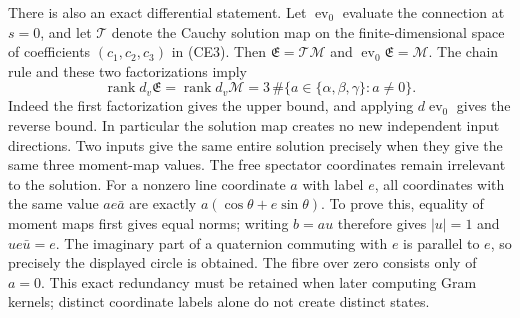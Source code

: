 \documentclass[11pt]{article}
\begin{document}
There is also an exact differential statement. Let \(\operatorname{ev}_0\)
evaluate the connection at \(s=0\), and let \(\mathcal T\) denote the
Cauchy solution map on the finite-dimensional space of coefficients
\((c_1,c_2,c_3)\) in (CE3). Then
\(\mathfrak E=\mathcal T\mathcal M\) and
\(\operatorname{ev}_0\mathfrak E=\mathcal M\). The chain rule and these
two factorizations imply
\[
 \operatorname{rank}d_v\mathfrak E
   =\operatorname{rank}d_v\mathcal M
   =3\,\#\{a\in\{\alpha,\beta,\gamma\}:a\ne0\}.
 \tag{CE34a}
\]
Indeed the first factorization gives the upper bound, and applying
\(d\operatorname{ev}_0\) gives the reverse bound. In particular the
solution map creates no new independent input directions.
Two inputs give the same entire solution precisely when they give the
same three moment-map values. The free spectator coordinates remain
irrelevant to the solution. For a nonzero line coordinate \(a\) with
label \(e\), all coordinates with the same value \(ae\bar a\) are
exactly \(a(\cos\theta+e\sin\theta)\). To prove this, equality of moment
maps first gives equal norms; writing \(b=au\) therefore gives
\(|u|=1\) and \(ue\bar u=e\). The imaginary part of a quaternion
commuting with \(e\) is parallel to \(e\), so precisely the displayed
circle is obtained. The fibre over zero consists only of \(a=0\).
This exact redundancy must be retained when later computing Gram
kernels; distinct coordinate labels alone do not create distinct states.
\end{document}
